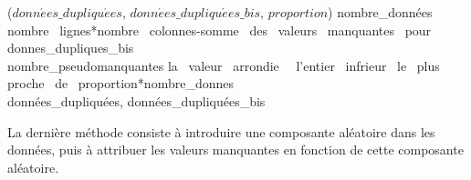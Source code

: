 \documentclass[12pt, openany, fleqn, french]{article}
\begin{document}
\begin{algorithm}[H]
\footnotesize
{} {($donn\acute{e}es\_dupliqu\acute{e}es$, $donn\acute{e}es\_dupliqu\acute{e}es\_bis$, $proportion$)}
    \State nombre\_données \gets nombre \, lignes*nombre \, colonnes-somme \, des \, valeurs \, manquantes \, pour \, donnes\_dupliques\_bis\\
    \State nombre\_pseudomanquantes \gets la \, valeur \, arrondie \,  \, l'entier \, infrieur \, le \, plus \, proche \, de \, proportion*nombre\_donnes\\
    \State \Return données\_dupliquées, données\_dupliquées\_bis\\
    \EndFunction
\end{algorithm}

\vspace{0.5cm}

La dernière méthode consiste à introduire une composante aléatoire dans les données, puis à attribuer les valeurs manquantes en fonction de cette composante aléatoire.
\end{document}
